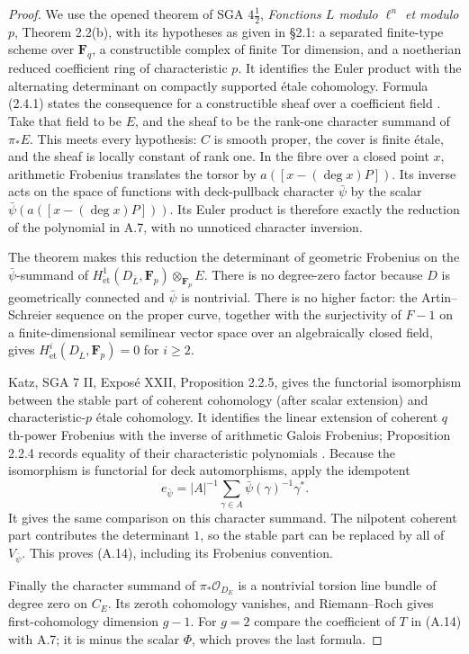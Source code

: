 \documentclass[11pt]{article}
\begin{document}
\begin{proof}
We use the opened theorem of SGA $4\frac12$, \emph{Fonctions $L$ modulo
$\ell^n$ et modulo $p$}, Theorem 2.2(b), with its hypotheses as given
in \S2.1: a separated finite-type scheme over $\mathbf F_q$, a
constructible complex of finite Tor dimension, and a noetherian reduced
coefficient ring of characteristic $p$.  It identifies the Euler product
with the alternating determinant on compactly supported \'etale
cohomology.  Formula (2.4.1) states the consequence for a constructible
sheaf over a coefficient field \cite{AC_Deligne1977}.
Take that field to be $E$, and the sheaf to be the rank-one character
summand of $\pi_*E$.  This meets every hypothesis: $C$ is smooth proper,
the cover is finite \'etale, and the sheaf is locally constant of rank
one.  In the fibre over a closed point $x$, arithmetic Frobenius
translates the torsor by $a([x-(\deg x)P])$.  Its inverse acts on the
space of functions with deck-pullback character $\bar\psi$ by the scalar
$\bar\psi(a([x-(\deg x)P]))$.  Its Euler product is therefore exactly
the reduction of the polynomial in A.7, with no unnoticed character
inversion.

The theorem makes this reduction the determinant of geometric Frobenius
on the $\bar\psi$-summand of $H^1_{\mathrm{\acute et}}
(D_{\overline L},\mathbf F_p)\otimes_{\mathbf F_p}E$.
There is no degree-zero factor because $D$ is geometrically connected
and $\bar\psi$ is nontrivial.  There is no higher factor: the
Artin--Schreier sequence on the proper curve, together with the
surjectivity of $F-1$ on a finite-dimensional semilinear vector space
over an algebraically closed field, gives
$H^i_{\mathrm{\acute et}}(D_{\overline L},\mathbf F_p)=0$ for $i\ge2$.

Katz, SGA 7 II, Expos\'e XXII, Proposition 2.2.5, gives the functorial
isomorphism between the stable part of coherent cohomology (after scalar
extension) and characteristic-$p$ \'etale cohomology.  It identifies the
linear extension of coherent $q$th-power Frobenius with the inverse of
arithmetic Galois Frobenius; Proposition 2.2.4 records equality of their
characteristic polynomials \cite{AC_Katz1973}.  Because the isomorphism
is functorial for deck automorphisms, apply the idempotent
\[
          e_{\bar\psi}=|A|^{-1}
              \sum_{\gamma\in A}\bar\psi(\gamma)^{-1}\gamma^*.
\]
It gives the same comparison on this character summand.  The nilpotent
coherent part contributes the determinant $1$, so the stable part can
be replaced by all of $V_{\bar\psi}$.  This proves (A.14), including its
Frobenius convention.

Finally the character summand of $\pi_*\mathcal O_{D_E}$ is a nontrivial
torsion line bundle of degree zero on $C_E$.  Its zeroth cohomology
vanishes, and Riemann--Roch gives first-cohomology dimension $g-1$.
For $g=2$ compare the coefficient of $T$ in (A.14) with A.7; it is
minus the scalar $\Phi$, which proves the last formula.
\end{proof}
\end{document}
